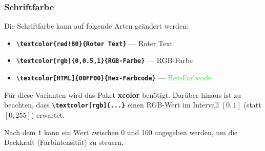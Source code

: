 \newpage

\subsubsection{Schriftfarbe}
\label{sec:schriftfarbe}
Die Schriftfarbe kann auf folgende Arten geändert werden:

\begin{itemize}
    \item \textbf{\texttt{\textbackslash textcolor\{red!80\}\{Roter Text\}}}
          \hspace{2.26cm} --- \hspace{1cm} \textcolor{red!80}{Roter Text}

    \item \textbf{\texttt{\textbackslash textcolor[rgb]\{0,0.5,1\}\{RGB-Farbe\}}}
          \hspace{1.35cm} --- \hspace{1cm} \textcolor[rgb]{0,0.5,1}{RGB-Farbe}

    \item \textbf{\texttt{\textbackslash textcolor[HTML]\{00FF00\}\{Hex-Farbcode\}}}
          \hspace{0.8cm} --- \hspace{1cm} \textcolor[HTML]{00FF00}{Hex-Farbcode}
\end{itemize}

Für diese Varianten wird das Paket \textbf{xcolor} benötigt. Darüber hinaus ist zu beachten, dass \textbf{\texttt{\textbackslash textcolor[rgb]\{...\}}} einen RGB-Wert im Intervall $[0,1]$ (statt $[0,255]$) erwartet.

Nach dem \textbf{\texttt{!}} kann ein Wert zwischen 0 und 100 angegeben werden, um die Deckkraft (Farbintensität) zu steuern.



